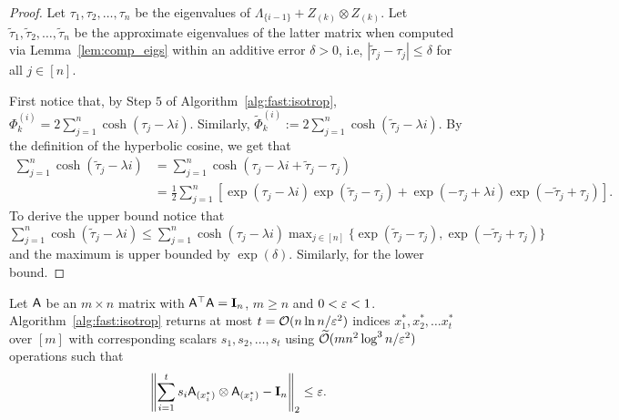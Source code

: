 \begin{proof}
Let $\tau_1,\tau_2 , \ldots , \tau_n$ be the eigenvalues of $\Lambda_{\{i -1\}} + Z_{(k)} \otimes Z_{(k)}$. Let $\widetilde{\tau}_1, \widetilde{\tau}_2 ,\dots ,\widetilde{\tau}_n$ be the approximate eigenvalues of the latter matrix when computed via Lemma~\ref{lem:comp_eigs} within an additive error $\delta>0 $, i.e, $|\widetilde{\tau}_j - \tau_j| \leq \delta$ for all $j\in{[n]}$.

First notice that, by Step $5$ of Algorithm~\ref{alg:fast:isotrop}, $\Phi_k^{(i)} = 2 \sum_{j=1}^{n} \cosh (\tau_j - \lambda i)$. Similarly, $\widetilde{\Phi}_k^{(i)}:= 2 \sum_{j=1}^{n} \cosh (\widetilde{\tau}_j - \lambda i)$. By the definition of the hyperbolic cosine, we get that
\begin{align*}
	\sum_{j=1}^{n} \cosh (\widetilde{\tau}_j - \lambda i )   & =  \sum_{j=1}^{n} \cosh (\tau_j - \lambda i  + \widetilde{\tau}_j - \tau_j )  \\
	& = \frac1{2}\sum_{j=1}^{n} \left[\exp (\tau_j - \lambda i)\exp(\widetilde{\tau}_j - \tau_j ) + \exp (-\tau_j + \lambda i)\exp(-\widetilde{\tau}_j + \tau_j )\right].
\end{align*}
To derive the upper bound notice that $\sum_{j=1}^{n} \cosh (\widetilde{\tau}_j - \lambda i )  \leq  \sum_{j=1}^{n} \cosh (\tau_j - \lambda i) \max_{j\in{[n]}}\{ \exp(\widetilde{\tau}_j - \tau_j), \exp ( - \widetilde{\tau}_j + \tau_j) \}$
and the maximum is upper bounded by $\exp(\delta)$. Similarly, for the lower bound.
\end{proof}
%
%
%
%
%
\begin{theorem}\label{thm:derand:isotrop:fast}
Let ${\mathsf{A} }$ be an $m\times n$ matrix with ${\mathsf{A} }^\top {\ensuremath{\mathsf{A} }} = \mathbf{I}_n$, $m\geq n$ and $ 0 < \varepsilon <1$. Algorithm~\ref{alg:fast:isotrop} returns at most $t=\mathcal{O}(n  \ln n/\varepsilon^2)$ indices $x_1^*,x_2^*,\ldots x_t^*$ over $[m]$ with corresponding scalars $s_1,s_2,\ldots ,s_t$ using $\widetilde{\mathcal{O}}(mn^2 \log^3 n /\varepsilon^2 )$ operations such that
\begin{equation}\label{eq:main_thm:fast:main_eqn}
	\left\| \sum_{i=1}^{t} s_i {\mathsf{A} }_{(x_i^*)} \otimes {\ensuremath{\mathsf{A} }}_{(x_i^*)} - \mathbf{I}_n\right\|_2 \leq \varepsilon.
\end{equation}
\end{theorem}
